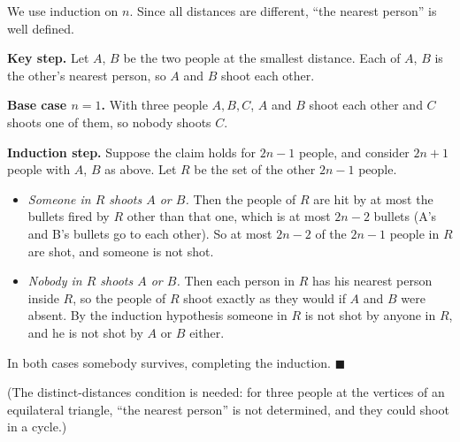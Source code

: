 We use induction on $n$. Since all distances are different, ``the nearest person'' is well defined.

\textbf{Key step.} Let $A$, $B$ be the two people at the smallest distance. Each of $A$, $B$ is the other's nearest person, so $A$ and $B$ shoot each other.

\textbf{Base case $n=1$.} With three people $A,B,C$, $A$ and $B$ shoot each other and $C$ shoots one of them, so nobody shoots $C$.

\textbf{Induction step.} Suppose the claim holds for $2n-1$ people, and consider $2n+1$ people with $A$, $B$ as above. Let $R$ be the set of the other $2n-1$ people.
\begin{itemize}
\item \emph{Someone in $R$ shoots $A$ or $B$.} Then the people of $R$ are hit by at most the bullets fired by $R$ other than that one, which is at most $2n-2$ bullets (A's and B's bullets go to each other). So at most $2n-2$ of the $2n-1$ people in $R$ are shot, and someone is not shot.
\item \emph{Nobody in $R$ shoots $A$ or $B$.} Then each person in $R$ has his nearest person inside $R$, so the people of $R$ shoot exactly as they would if $A$ and $B$ were absent. By the induction hypothesis someone in $R$ is not shot by anyone in $R$, and he is not shot by $A$ or $B$ either.
\end{itemize}
In both cases somebody survives, completing the induction. $\blacksquare$

(The distinct-distances condition is needed: for three people at the vertices of an equilateral triangle, ``the nearest person'' is not determined, and they could shoot in a cycle.)
